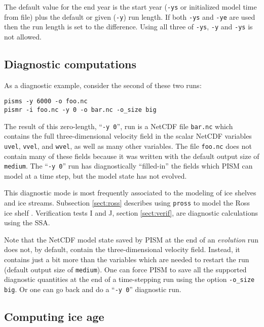 The default value for the end year is the start year (\texttt{-ys} or initialized model time from file) plus the default or given (\texttt{-y}) run length.  If both \texttt{-ys} and \texttt{-ye} are used then the run length is set to the difference.  Using all three of \texttt{-ys}, \texttt{-y} and \texttt{-ys} is not allowed.


\subsection{Diagnostic computations}  As a diagnostic example, consider the second of these two runs:

\begin{verbatim}
pisms -y 6000 -o foo.nc
pismr -i foo.nc -y 0 -o bar.nc -o_size big
\end{verbatim}

\noindent The result of this zero-length, ``\texttt{-y 0}'', run is a NetCDF file \texttt{bar.nc} which contains the full three-dimensional velocity field in the scalar NetCDF variables \texttt{uvel}, \texttt{vvel}, and \texttt{wvel}, as well as many other variables.  The file \texttt{foo.nc} does not contain many of these fields because it was written with the default output size of \texttt{medium}.  The ``\texttt{-y 0}'' run has diagnostically ``filled-in'' the fields which PISM can model at a time step, but the model state has not evolved.

This diagnostic mode is most frequently associated to the modeling of ice shelves and ice streams.  Subsection \ref{sect:ross} describes using \texttt{pross} to model the Ross ice shelf \cite{MacAyealetal}.  Verification tests I and J, section \ref{sect:verif}, are diagnostic calculations using the SSA.

Note that the NetCDF model state saved by PISM at the end of an \emph{evolution} run does not, by default, contain the three-dimensional velocity field.  Instead, it contains just a bit more than the variables which are needed to restart the run (default output size of \texttt{medium}).  One can  force PISM to save all the supported diagnostic quantities at the end of a time-stepping run using the option \texttt{-o_size big}.  Or one can go back and do a ``\texttt{-y 0}'' diagnostic run.


\subsection{Computing ice age} \label{subsect:age}

